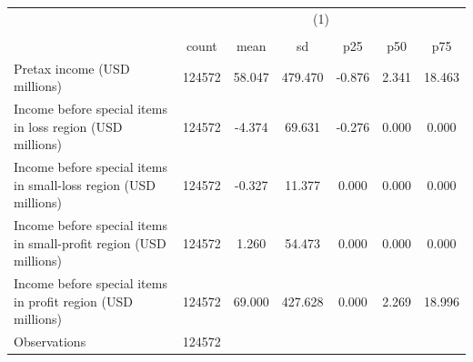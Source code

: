 {
\def\sym#1{\ifmmode^{#1}\else\(^{#1}\)\fi}
\begin{tabular}{l*{1}{cccccc}}
\hline\hline
                    &\multicolumn{6}{c}{(1)}                                                      \\
                    &\multicolumn{6}{c}{}                                                         \\
                    &       count&        mean&          sd&         p25&         p50&         p75\\
\hline
Pretax income (USD millions)&      124572&      58.047&     479.470&      -0.876&       2.341&      18.463\\
Income before special items in loss region (USD millions)&      124572&      -4.374&      69.631&      -0.276&       0.000&       0.000\\
Income before special items in small-loss region (USD millions)&      124572&      -0.327&      11.377&       0.000&       0.000&       0.000\\
Income before special items in small-profit region (USD millions)&      124572&       1.260&      54.473&       0.000&       0.000&       0.000\\
Income before special items in profit region (USD millions)&      124572&      69.000&     427.628&       0.000&       2.269&      18.996\\
\hline
Observations        &      124572&            &            &            &            &            \\
\hline\hline
\end{tabular}
}
